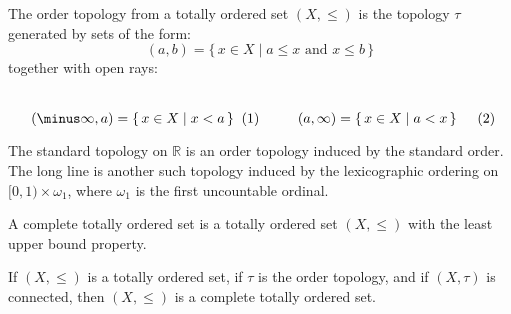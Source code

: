 \documentclass[oneside]{book}                                                  %
\begin{document}
            \begin{definition}
                The order topology from a totally ordered set $(X,\leq)$ is
                the topology $\tau$ generated by sets of the form:
                \begin{equation}
                    (a,b)=\{\,x\in{X}\;|\;a\leq{x}\textrm{ and }x\leq{b}\,\}
                \end{equation}
                together with open rays:
                \par
                \begin{subequations}
                    \begin{minipage}[b]{0.49\textwidth}
                        \centering
                        \begin{equation}
                            (\minus\infty,a)=\{\,x\in{X}\;|\;x<a\,\}
                        \end{equation}
                    \end{minipage}
                    \hfill
                    \begin{minipage}[b]{0.49\textwidth}
                        \centering
                        \begin{equation}
                            (a,\infty)=\{\,x\in{X}\;|\;a<x\,\}
                        \end{equation}
                    \end{minipage}
                \end{subequations}
                \par\vspace{2.5ex}
            \end{definition}
            \begin{example}
                The standard topology on $\mathbb{R}$ is an order topology
                induced by the standard order. The long line is another such
                topology induced by the lexicographic ordering on
                $[0,1)\times\omega_{1}$, where $\omega_{1}$ is the first
                uncountable ordinal.
            \end{example}
            \begin{definition}
                A complete totally ordered set is a totally ordered set
                $(X,\leq)$ with the least upper bound property.
            \end{definition}
            \begin{theorem}
                If $(X,\leq)$ is a totally ordered set, if $\tau$ is the order
                topology, and if $(X,\tau)$ is connected, then $(X,\leq)$ is
                a complete totally ordered set.
            \end{theorem}
\end{document}
